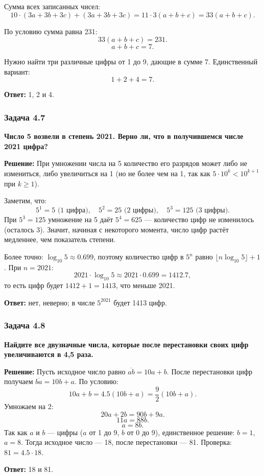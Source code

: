 \documentclass[12pt, a4paper]{article}
\begin{document}
Сумма всех записанных чисел:
\[
10 \cdot (3a + 3b + 3c) + (3a + 3b + 3c) = 11 \cdot 3(a + b + c) = 33(a + b + c).
\]

По условию сумма равна 231:
\[
33(a + b + c) = 231.
\]
\[
a + b + c = 7.
\]

Нужно найти три различные цифры от 1 до 9, дающие в сумме 7. Единственный вариант:
\[
1 + 2 + 4 = 7.
\]

\textbf{Ответ:} 1, 2 и 4.

\subsubsection*{Задача 4.7}
\textbf{Число 5 возвели в степень 2021. Верно ли, что в получившемся числе 2021 цифра?}

\textbf{Решение:}
При умножении числа на 5 количество его разрядов может либо не измениться, либо увеличиться на 1 (но не более чем на 1, так как $5 \cdot 10^k < 10^{k+1}$ при $k \ge 1$). 

Заметим, что:
\[
5^1 = 5 \text{ (1 цифра)},\quad 5^2 = 25 \text{ (2 цифры)},\quad 5^3 = 125 \text{ (3 цифры)}.
\]
При $5^3 = 125$ умножение на 5 даёт $5^4 = 625$ — количество цифр не изменилось (осталось 3). Значит, начиная с некоторого момента, число цифр растёт медленнее, чем показатель степени.

Более точно: $\log_{10} 5 \approx 0.699$, поэтому количество цифр в $5^n$ равно $\lfloor n \log_{10} 5 \rfloor + 1$. При $n = 2021$:
\[
2021 \cdot \log_{10} 5 \approx 2021 \cdot 0.699 = 1412.7,
\]
то есть цифр будет $1412 + 1 = 1413$, что меньше 2021.

\textbf{Ответ:} нет, неверно; в числе $5^{2021}$ будет 1413 цифр.

\subsubsection*{Задача 4.8}
\textbf{Найдите все двузначные числа, которые после перестановки своих цифр увеличиваются в 4,5 раза.}

\textbf{Решение:}
Пусть исходное число равно $\overline{ab} = 10a + b$. После перестановки цифр получаем $\overline{ba} = 10b + a$. По условию:
\[
10a + b = 4.5(10b + a) = \frac{9}{2}(10b + a).
\]
Умножаем на 2:
\[
20a + 2b = 90b + 9a.
\]
\[
11a = 88b.
\]
\[
a = 8b.
\]
Так как $a$ и $b$ — цифры ($a$ от 1 до 9, $b$ от 0 до 9), единственное решение: $b = 1$, $a = 8$. Тогда исходное число — 18, после перестановки — 81. Проверка: $81 = 4.5 \cdot 18$.

\textbf{Ответ:} 18 и 81.
\end{document}
